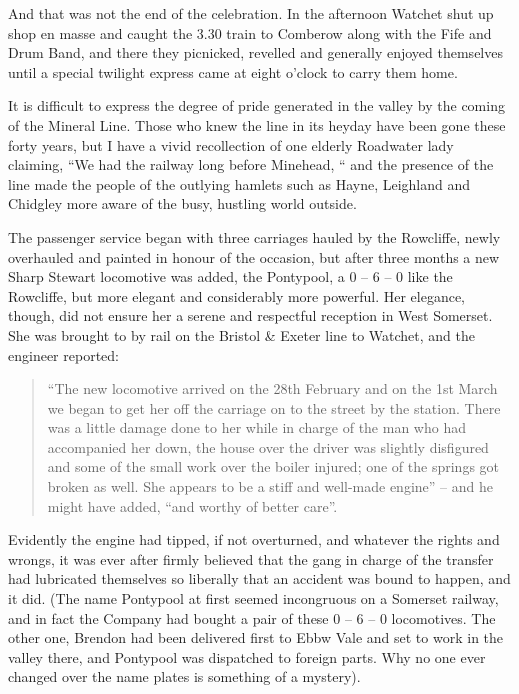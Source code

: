 \documentclass[11pt]{book}
\begin{document}
And that was not the end of the celebration. In the afternoon  Watchet shut up shop  en masse and caught the 3.30 train to Comberow along with the Fife and Drum Band, and there they picnicked, revelled and generally enjoyed themselves until a special twilight express  came at eight o’clock to carry them home.

 It is difficult to express the degree of pride generated in the valley by the coming of the Mineral Line. Those who knew the line in its heyday have been gone these forty years, but I have a vivid recollection of one elderly Roadwater lady claiming,  “We had the railway long before Minehead, “ and the presence  of the line made the people of the outlying hamlets such as Hayne, Leighland and Chidgley more aware of the busy, hustling world outside.
 
The passenger service began with three carriages hauled by the Rowcliffe, newly overhauled and painted in honour of the occasion, but after three months a new Sharp Stewart locomotive was added, the Pontypool, a 0 – 6 – 0 like the Rowcliffe, but more elegant and considerably more powerful. Her elegance, though, did not ensure her a serene and respectful reception in West Somerset. She was brought to by rail on the Bristol \& Exeter line to Watchet, and the engineer reported:

\begin{quote}
“The new locomotive arrived on the 28th February and on the 1st March we began to get her off the carriage on to the street by the station. There was a little damage done to her while in charge of the man who had accompanied her down, the house over the driver was slightly disfigured and some of the small work over the boiler  injured; one of the springs got broken as well.  She appears to be a stiff and well-made engine” – and he might have added, “and worthy of better care”.
\end{quote}

Evidently the engine had tipped, if not overturned, and whatever the rights and wrongs, it was ever after firmly believed that the gang in charge of the transfer had lubricated themselves so liberally that an accident was bound to happen, and it did. (The name Pontypool at first seemed incongruous on a Somerset railway, and in fact the Company had bought a pair of these 0 – 6 – 0 locomotives. The other one, Brendon had been delivered first to Ebbw Vale and set to work in the valley there, and Pontypool  was dispatched to foreign parts. Why no one ever changed over the name plates is something of a mystery).
\end{document}
